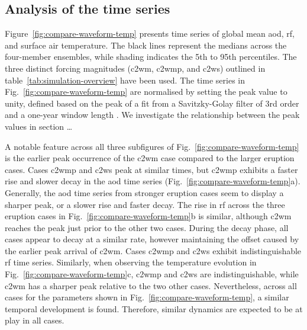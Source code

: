 \documentclass{ametsocV6.1}
\begin{document}

\subsection{Analysis of the time series}

Figure~\ref{fig:compare-waveform-temp} presents time series of global mean \gls{aod},
\gls{rf}, and surface air temperature. The black lines represent the medians across the
four-member ensembles, while shading indicates the 5th to 95th percentiles. The three
distinct forcing magnitudes (\gls{c2wm}, \gls{c2wmp}, and \gls{c2ws}) outlined in
table~\ref{tab:simulation-overview} have been used. The time series in
Fig.~\ref{fig:compare-waveform-temp} are normalised by setting the peak value to unity,
defined based on the peak of a fit from a Savitzky-Golay filter of 3rd order and a
one-year window length \citep{savitzky1964}. We investigate the relationship between the
peak values in section \dots

A notable feature across all three subfigures of Fig.~\ref{fig:compare-waveform-temp} is
the earlier peak occurrence of the \gls{c2wm} case compared to the larger eruption
cases. Cases \gls{c2wmp} and \gls{c2ws} peak at similar times, but \gls{c2wmp} exhibits
a faster rise and slower decay in the \gls{aod} time series
(Fig.~\ref{fig:compare-waveform-temp}a). Generally, the \gls{aod} time series from
stronger eruption cases seem to display a sharper peak, or a slower rise and faster
decay. The rise in \gls{rf} across the three eruption cases in
Fig.~\ref{fig:compare-waveform-temp}b is similar, although \gls{c2wm} reaches the peak
just prior to the other two cases. During the decay phase, all cases appear to decay at
a similar rate, however maintaining the offset caused by the earlier peak arrival of
\gls{c2wm}. Cases \gls{c2wmp} and \gls{c2ws} exhibit indistinguishable \gls{rf} time
series. Similarly, when observing the temperature evolution in
Fig.~\ref{fig:compare-waveform-temp}c, \gls{c2wmp} and \gls{c2ws} are indistinguishable,
while \gls{c2wm} has a sharper peak relative to the two other cases. Nevertheless,
across all cases for the parameters shown in Fig.~\ref{fig:compare-waveform-temp}, a
similar temporal development is found. Therefore, similar dynamics are expected to be at
play in all cases.
\end{document}
